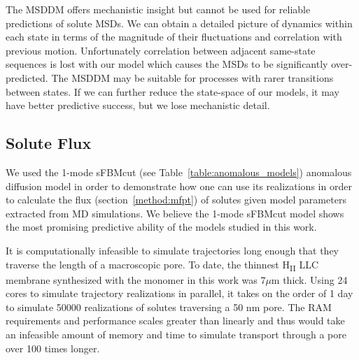 \documentclass{article}
\begin{document}
  The MSDDM offers mechanistic insight but cannot be used for reliable predictions
  of solute MSDs. We can obtain a detailed picture of dynamics within each state in
  terms of the magnitude of their fluctuations and correlation with previous 
  motion. Unfortunately correlation between adjacent same-state sequences is lost
  with our model which causes the MSDs to be significantly over-predicted. The MSDDM
  may be suitable for processes with rarer transitions between states. If we can 
  further reduce the state-space of our models, it may have better predictive success,
  but we lose mechanistic detail.
  
  \subsection{Solute Flux}\label{section:mfpt}
  
  We used the 1-mode sFBMcut (see Table~\ref{table:anomalous_models}) anomalous 
  diffusion model in order to demonstrate how one can use its realizations in
  order to calculate the flux (section~\ref{method:mfpt}) of solutes given model 
  parameters extracted from MD simulations. We believe the 1-mode sFBMcut model
  shows the most promising predictive ability of the models studied in this work. 




  It is computationally infeasible to simulate trajectories long enough that they
  traverse the length of a macroscopic pore. To date, the thinnest H\textsubscript{II}
  LLC membrane synthesized with the monomer in this work was 7$\mu$m thick. Using
  24 cores to simulate trajectory realizations in parallel, it takes on the order 
  of 1 day to simulate 50000 realizations of solutes traversing a 50 nm pore. The 
  RAM requirements and performance scales greater than linearly and thus would 
  take an infeasible amount of memory and time to simulate transport through a 
  pore over 100 times longer.
  
\end{document}
